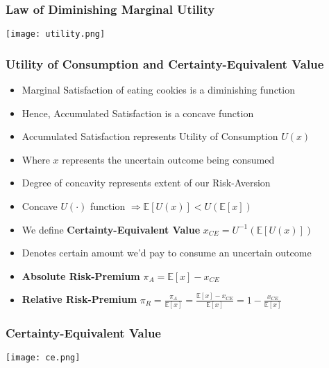 \documentclass[handout]{beamer}
\begin{document}
\begin{frame}
\frametitle{Law of Diminishing Marginal Utility}
\texttt{[image: utility.png]}
\end{frame}

\begin{frame}
\frametitle{Utility of Consumption and Certainty-Equivalent Value}
\pause
\begin{itemize}[<+->]
\item Marginal Satisfaction of eating cookies is a diminishing function
\item Hence, Accumulated Satisfaction is a concave function
\item Accumulated Satisfaction represents Utility of Consumption $U(x)$
\item Where $x$ represents the uncertain outcome being consumed
\item Degree of concavity represents extent of our Risk-Aversion
\item Concave $U(\cdot)$ function $\Rightarrow \mathbb{E}[U(x)] <  U(\mathbb{E}[x])$
\item We define {\bf Certainty-Equivalent Value} $x_{CE} = U^{-1}(\mathbb{E}[U(x)])$
\item Denotes certain amount we'd pay to consume an uncertain outcome
\item {\bf Absolute Risk-Premium} $\pi_A = \mathbb{E}[x] - x_{CE}$
\item {\bf Relative Risk-Premium} $\pi_R = \frac {\pi_A} {\mathbb{E}[x]} = \frac{\mathbb{E}[x] - x_{CE}} {\mathbb{E}[x]} = 1 - \frac {x_{CE}} {\mathbb{E}[x]}$
\end{itemize}
\end{frame}

\begin{frame}
\frametitle{Certainty-Equivalent Value}
\texttt{[image: ce.png]}
\end{frame}
\end{document}
